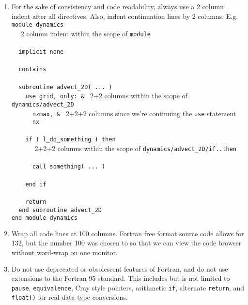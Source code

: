 \documentclass[letterpaper,12pt]{article}
\begin{document}
\begin{enumerate}
\item For the sake of consistency and code readability, always use a 2 column 
indent after all directives. Also, indent continuation lines by 2 columns. \newline
E.g. \\
\verb|module dynamics| \\
\verb*|  | {\small 2 column indent within the scope of \texttt{module}} \\
\verb|| \\
\verb*|  implicit|\verb| none| \\
\verb|| \\
\verb*|  contains| \\
\verb|| \\
\verb*|  subroutine|\verb| advect_2D( ... )| \\
\verb*|    use|\verb| grid, only: & | {\small 2+2 columns within the scope of \texttt{dynamics/advect\_2D}} \\
\verb*|      nzmax,|\verb| & | {\small 2+2+2 columns since we're continuing the \texttt{use} statement}  \\
\verb*|      nx| \\
\verb|| \\
\verb*|    if|\verb| ( l_do_something ) then| \\
\verb*|      | {\small 2+2+2 columns within the scope of \texttt{dynamics/advect\_2D/if..then}} \\
\verb|| \\
\verb*|      |\verb|call something( ... )| \\
\verb|| \\
\verb*|    end|\verb| if| \\
\verb|| \\
\verb*|    return| \\
\verb*|  end|\verb| subroutine advect_2D| \\

\verb|end module dynamics|

\item Wrap all code lines at 100 columns.  Fortran free format source code
allows for 132, but the number 100 was chosen to so that we can view the code 
browser without word-wrap on one monitor.

\item Do not use deprecated or obsolescent features of Fortran, and do not
use extensions to the Fortran 95 standard.  This includes but is not limited to
\texttt{pause}, \texttt{equivalence}, Cray style pointers, 
arithmetic \texttt{if}, alternate \texttt{return}, and \texttt{float()} for 
real data type conversions.


\end{enumerate}
\end{document}
